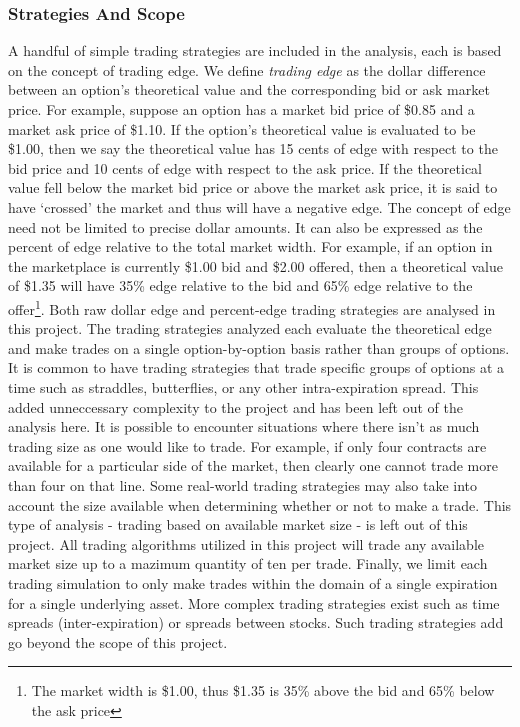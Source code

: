 \documentclass[12pt, a4paper, notitlepage]{article}
\numberwithin{equation}{subsection}
\numberwithin{figure}{subsection}
\numberwithin{table}{subsection}
\newcommand{\newpar}{\newline \newline}
\begin{document}
\subsubsection{Strategies And Scope}
\label{subsec:TradingStrategiesAndScope}
A handful of simple trading strategies are included in the analysis, each is based on the concept of trading edge.  We define \textit{trading edge} as the dollar difference between an option's theoretical value and the corresponding bid or ask market price.  For example, suppose an option has a market bid price of \$0.85 and a market ask price of \$1.10.  If the option's theoretical value is evaluated to be \$1.00, then we say the theoretical value has 15 cents of edge with respect to the bid price and 10 cents of edge with respect to the ask price.  If the theoretical value fell below the market bid price or above the market ask price, it is said to have `crossed' the market and thus will have a negative edge.
\newpar
The concept of edge need not be limited to precise dollar amounts.  It can also be expressed as the percent of edge relative to the total market width.  For example, if an option in the marketplace is currently \$1.00 bid and \$2.00 offered, then a theoretical value of \$1.35 will have 35\% edge relative to the bid and 65\% edge relative to the offer\footnote{The market width is \$1.00, thus \$1.35 is 35\% above the bid and 65\% below the ask price}.  Both raw dollar edge and percent-edge trading strategies are analysed in this project.
\newpar
The trading strategies analyzed each evaluate the theoretical edge and make trades on a single option-by-option basis rather than groups of options.  It is common to have trading strategies that trade specific groups of options at a time such as straddles, butterflies, or any other intra-expiration spread.  This added unneccessary complexity to the project and has been left out of the analysis here.
\newpar
It is possible to encounter situations where there isn't as much trading size as one would like to trade.  For example, if only four contracts are available for a particular side of the market, then clearly one cannot trade more than four on that line.  Some real-world trading strategies may also take into account the size available when determining whether or not to make a trade.  This type of analysis - trading based on available market size - is left out of this project.  All trading algorithms utilized in this project will trade any available market size up to a mazimum quantity of ten per trade.
\newpar
Finally, we limit each trading simulation to only make trades within the domain of a single expiration for a single underlying asset.  More complex trading strategies exist such as time spreads (inter-expiration) or spreads between stocks.  Such trading strategies add go beyond the scope of this project.
\end{document}
